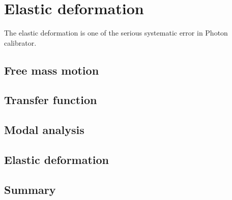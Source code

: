 
\chapter{Elastic deformation} %

\label{Chapter4} %
The elastic deformation is one of the serious systematic error in Photon calibrator.


\section{Free mass motion}
\section{Transfer function}
\section{Modal analysis}
\section{Elastic deformation}
\section{Summary}